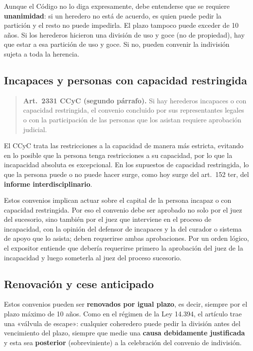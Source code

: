 \documentclass[12pt,oneside]{book}
\begin{document}
Aunque el Código no lo diga expresamente, debe entenderse que se requiere \textbf{unanimidad}: si un heredero no está de acuerdo, es quien puede pedir la partición y el resto no puede impedirla. El plazo tampoco puede exceder de 10 años. Si los herederos hicieron una división de uso y goce (no de propiedad), hay que estar a esa partición de uso y goce. Si no, pueden convenir la indivisión sujeta a toda la herencia.

\subsection{Incapaces y personas con capacidad restringida}

\begin{quote}
\textbf{Art.~2331 CCyC (segundo párrafo).} Si hay herederos incapaces o con capacidad restringida, el convenio concluido por sus representantes legales o con la participación de las personas que los asistan requiere aprobación judicial.
\end{quote}

El CCyC trata las restricciones a la capacidad de manera más estricta, evitando en lo posible que la persona tenga restricciones a su capacidad, por lo que la incapacidad absoluta es excepcional. En los supuestos de capacidad restringida, lo que la persona puede o no puede hacer surge, como hoy surge del art.~152 ter, del \textbf{informe interdisciplinario}.

Estos convenios implican actuar sobre el capital de la persona incapaz o con capacidad restringida. Por eso el convenio debe ser aprobado no solo por el juez del sucesorio, sino también por el juez que interviene en el proceso de incapacidad, con la opinión del defensor de incapaces y la del curador o sistema de apoyo que lo asista; deben requerirse ambas aprobaciones. Por un orden lógico, el expositor entiende que debería requerirse primero la aprobación del juez de la incapacidad y luego someterla al juez del proceso sucesorio.

\subsection{Renovación y cese anticipado}

Estos convenios pueden ser \textbf{renovados por igual plazo}, es decir, siempre por el plazo máximo de 10 años. Como en el régimen de la Ley 14.394, el artículo trae una «válvula de escape»: cualquier coheredero puede pedir la división antes del vencimiento del plazo, siempre que medie una \textbf{causa debidamente justificada} y esta sea \textbf{posterior} (sobreviniente) a la celebración del convenio de indivisión.
\end{document}

